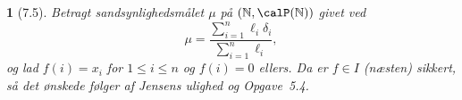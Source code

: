 \documentclass[a4paper, 11pt, article, danish, oneside]{memoir}
\title{\doctitle}
\author{\docauthor}
\newcommand{\naturals}{\mathbb{N}}
\DeclarePairedDelimiter{\auxdelimparen}{(}{)}
\newcommand{\powerset}[2][]{\calP\auxdelimparen[#1]{#2}}
\newcommand{\pencilsymbol}{\raisebox{-2pt}{\normalfont\PencilLeft}}
\theoremstyle{changedotcustomnumber}
\newtheorem{opgave}{\pencilsymbol}
\theoremstyle{changedotbreakcustomnumber}
\begin{document}
\maketitle


\begin{opgave}[7.5]
    Betragt sandsynlighedsmålet $\mu$ på $(\naturals, \powerset{\naturals})$ givet ved
    \begin{equation*}
        \mu
            = \frac{\sum_{i=1}^n \ell_i \delta_i}{\sum_{i=1}^n \ell_i},
    \end{equation*}
    og lad $f(i) = x_i$ for $1 \leq i \leq n$ og $f(i) = 0$ ellers. Da er $f \in I$ (næsten) sikkert, så det ønskede følger af Jensens ulighed og Opgave~5.4.
\end{opgave}
\end{document}
